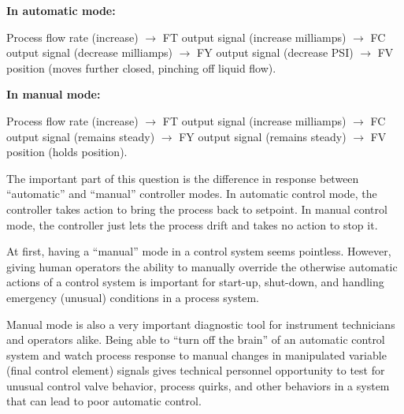 





\noindent
{\bf In automatic mode:}

Process flow rate (increase) $\to$ FT output signal (increase milliamps) $\to$ FC output signal (decrease milliamps) $\to$ FY output signal (decrease PSI) $\to$ FV position (moves further closed, pinching off liquid flow).

\vskip 10pt

\noindent
{\bf In manual mode:}

Process flow rate (increase) $\to$ FT output signal (increase milliamps) $\to$ FC output signal (remains steady) $\to$ FY output signal (remains steady) $\to$ FV position (holds position).

\vskip 10pt

The important part of this question is the difference in response between ``automatic'' and ``manual'' controller modes.  In automatic control mode, the controller takes action to bring the process back to setpoint.  In manual control mode, the controller just lets the process drift and takes no action to stop it.

At first, having a ``manual'' mode in a control system seems pointless.  However, giving human operators the ability to manually override the otherwise automatic actions of a control system is important for start-up, shut-down, and handling emergency (unusual) conditions in a process system.  

Manual mode is also a very important diagnostic tool for instrument technicians and operators alike.  Being able to ``turn off the brain'' of an automatic control system and watch process response to manual changes in manipulated variable (final control element) signals gives technical personnel opportunity to test for unusual control valve behavior, process quirks, and other behaviors in a system that can lead to poor automatic control. 














